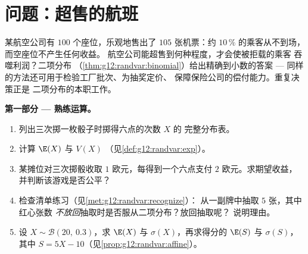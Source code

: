 \section{问题：超售的航班}

\begin{problem}
\label{pb:g12:randvar:1}
某航空公司有 $100$ 个座位，乐观地售出了 $105$ 张机票：约
$10\,\%$ 的乘客从不到场，而空座位不产生任何收益。
航空公司能超售到何种程度，才会使被拒载的乘客
吞噬利润？二项分布
（\cref{thm:g12:randvar:binomial}）给出精确到小数的答案 --- 
同样的方法还可用于检验工厂批次、为抽奖定价、
保障保险公司的偿付能力。重复决策正是
二项分布的本职工作。

\medskip
\noindent\textbf{第一部分 --- 熟练运算。}
\begin{enumerate}
  \item 列出三次掷一枚骰子时掷得六点的次数 $X$ 的
        完整分布表。
  \item 计算 $\E(X)$ 与 $V(X)$
        （见\cref{def:g12:randvar:exp}）。
  \item 某摊位对三次掷骰收取 $1$ 欧元，每得到一个六点支付 $2$
        欧元。求期望收益，
        并判断该游戏是否公平？
  \item 检查清单练习（见\cref{met:g12:randvar:recognize}）：
        从一副牌中抽取 $5$ 张，其中红心张数
        \emph{不放回}抽取时是否服从二项分布？放回抽取呢？
        说明理由。
  \item 设 $X \sim \mathcal B(20,\ 0.3)$，求 $\E(X)$ 与
        $\sigma(X)$，再求得分的 $\E(S)$ 与 $\sigma(S)$，
        其中 $S = 5X - 10$（见\cref{prop:g12:randvar:affine}）。
\end{enumerate}


\end{problem}

